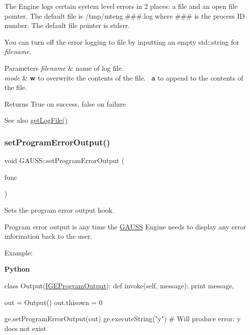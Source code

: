 The Engine logs certain system level errors in 2 places\+: a file and an open file pointer. The default file is {\ttfamily /tmp/mteng.\#\#\#.log} where {\ttfamily \#\#\#} is the process ID number. The default file pointer is stderr.

You can turn off the error logging to file by inputting an empty std\+::string for {\itshape filename}.


\begin{DoxyParams}{Parameters}
{\em filename} & name of log file. \\
\hline
{\em mode} & {\bfseries w} to overwrite the contents of the file.~\newline
 {\bfseries a} to append to the contents of the file. \\
\hline
\end{DoxyParams}
\begin{DoxyReturn}{Returns}
True on success, false on failure
\end{DoxyReturn}
\begin{DoxySeeAlso}{See also}
\hyperlink{class_g_a_u_s_s_a41c57746753165bfc8b2e71459c6ccde}{get\+Log\+File()} 
\end{DoxySeeAlso}
\mbox{\label{class_g_a_u_s_s_abd75266b2c4075da75163fe95b013ef3}} 
\subsubsection{\texorpdfstring{set\+Program\+Error\+Output()}{setProgramErrorOutput()}}
{\footnotesize\ttfamily void G\+A\+U\+S\+S\+::set\+Program\+Error\+Output (\begin{DoxyParamCaption}\item[{\hyperlink{class_i_g_e_program_output}{I\+G\+E\+Program\+Output} $\ast$}]{func }\end{DoxyParamCaption})\hspace{0.3cm}{\ttfamily [static]}}



Sets the program error output hook. 

Program error output is any time the \hyperlink{class_g_a_u_s_s}{G\+A\+U\+SS} Engine needs to display any error information back to the user.

Example\+:

{\bfseries Python} 
\begin{DoxyCode}
\textcolor{keyword}{class }Output(\hyperlink{class_i_g_e_program_output}{IGEProgramOutput}):
    \textcolor{keyword}{def }invoke(self, message):
        \textcolor{keywordflow}{print} message,

out = Output()
out.thisown = 0

ge.setProgramErrorOutput(out)
ge.executeString(\textcolor{stringliteral}{"y"})           \textcolor{comment}{# Will produce error: y does not exist}
\end{DoxyCode}


